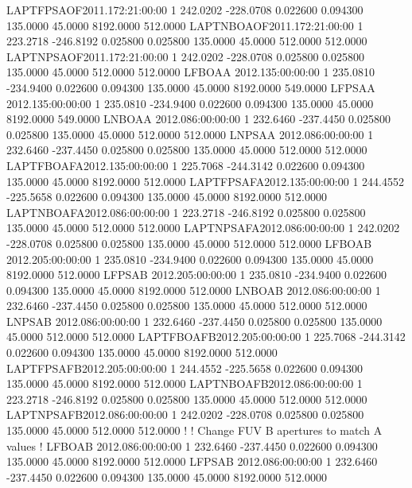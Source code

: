 LAPTFPSAOF2011.172:21:00:00  1    242.0202   -228.0708    0.022600    0.094300    135.0000     45.0000   8192.0000    512.0000
LAPTNBOAOF2011.172:21:00:00  1    223.2718   -246.8192    0.025800    0.025800    135.0000     45.0000    512.0000    512.0000
LAPTNPSAOF2011.172:21:00:00  1    242.0202   -228.0708    0.025800    0.025800    135.0000     45.0000    512.0000    512.0000
LFBOAA    2012.135:00:00:00  1    235.0810   -234.9400    0.022600    0.094300    135.0000     45.0000   8192.0000    549.0000
LFPSAA    2012.135:00:00:00  1    235.0810   -234.9400    0.022600    0.094300    135.0000     45.0000   8192.0000    549.0000
LNBOAA    2012.086:00:00:00  1    232.6460   -237.4450    0.025800    0.025800    135.0000     45.0000    512.0000    512.0000
LNPSAA    2012.086:00:00:00  1    232.6460   -237.4450    0.025800    0.025800    135.0000     45.0000    512.0000    512.0000
LAPTFBOAFA2012.135:00:00:00  1    225.7068   -244.3142    0.022600    0.094300    135.0000     45.0000   8192.0000    512.0000
LAPTFPSAFA2012.135:00:00:00  1    244.4552   -225.5658    0.022600    0.094300    135.0000     45.0000   8192.0000    512.0000
LAPTNBOAFA2012.086:00:00:00  1    223.2718   -246.8192    0.025800    0.025800    135.0000     45.0000    512.0000    512.0000
LAPTNPSAFA2012.086:00:00:00  1    242.0202   -228.0708    0.025800    0.025800    135.0000     45.0000    512.0000    512.0000
LFBOAB    2012.205:00:00:00  1    235.0810   -234.9400    0.022600    0.094300    135.0000     45.0000   8192.0000    512.0000
LFPSAB    2012.205:00:00:00  1    235.0810   -234.9400    0.022600    0.094300    135.0000     45.0000   8192.0000    512.0000
LNBOAB    2012.086:00:00:00  1    232.6460   -237.4450    0.025800    0.025800    135.0000     45.0000    512.0000    512.0000
LNPSAB    2012.086:00:00:00  1    232.6460   -237.4450    0.025800    0.025800    135.0000     45.0000    512.0000    512.0000
LAPTFBOAFB2012.205:00:00:00  1    225.7068   -244.3142    0.022600    0.094300    135.0000     45.0000   8192.0000    512.0000
LAPTFPSAFB2012.205:00:00:00  1    244.4552   -225.5658    0.022600    0.094300    135.0000     45.0000   8192.0000    512.0000
LAPTNBOAFB2012.086:00:00:00  1    223.2718   -246.8192    0.025800    0.025800    135.0000     45.0000    512.0000    512.0000
LAPTNPSAFB2012.086:00:00:00  1    242.0202   -228.0708    0.025800    0.025800    135.0000     45.0000    512.0000    512.0000
!
! Change FUV B apertures to match A values
!
LFBOAB    2012.086:00:00:00  1    232.6460   -237.4450    0.022600    0.094300    135.0000     45.0000   8192.0000    512.0000
LFPSAB    2012.086:00:00:00  1    232.6460   -237.4450    0.022600    0.094300    135.0000     45.0000   8192.0000    512.0000
